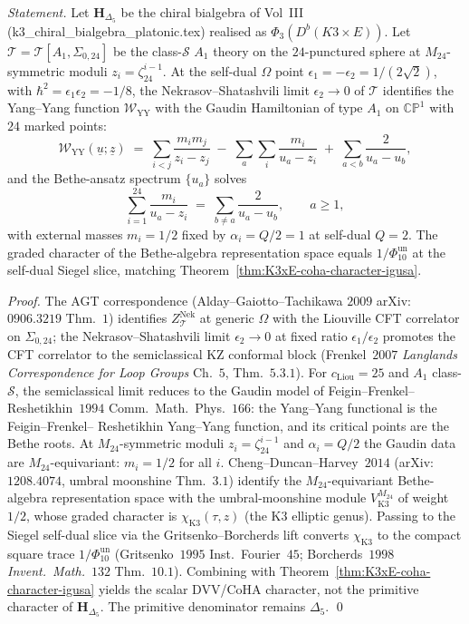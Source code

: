 \begin{proposition}
\label{prop:tcy3-nekrasov-ns-bethe}
\emph{Statement.} Let $\mathbf H_{\Delta_5}$ be the chiral
bialgebra of Vol~III (k3\_chiral\_bialgebra\_platonic.tex) realised
as $\Phi_3(D^b(K3\times E))$. Let $\mathcal T = \mathcal T[A_1,
\Sigma_{0,24}]$ be the class-$\mathcal S$ $A_1$ theory on the
$24$-punctured sphere at $M_{24}$-symmetric moduli $z_i =
\zeta_{24}^{i-1}$. At the self-dual $\Omega$ point
$\epsilon_1 = -\epsilon_2 = 1/(2\sqrt 2)$, with
$\hbar^2 = \epsilon_1\epsilon_2 = -1/8$, the
Nekrasov--Shatashvili limit $\epsilon_2 \to 0$ of $\mathcal T$
identifies the Yang--Yang function $\mathcal W_{\mathrm{YY}}$ with
the Gaudin Hamiltonian of type $A_1$ on $\mathbb{CP}^1$ with $24$
marked points:
\[
 \mathcal W_{\mathrm{YY}}(\underline u;\underline z)
 \;=\; \sum_{i<j}\frac{m_i m_j}{z_i - z_j}
 \;-\;\sum_a\sum_i\frac{m_i}{u_a - z_i}
 \;+\;\sum_{a < b}\frac{2}{u_a - u_b},
\]
and the Bethe-ansatz spectrum $\{u_a\}$ solves
\[
 \sum_{i = 1}^{24}\frac{m_i}{u_a - z_i}
 \;=\;
 \sum_{b\neq a}\frac{2}{u_a - u_b},\qquad a\geq 1,
\]
with external masses $m_i = 1/2$ fixed by $\alpha_i = Q/2 = 1$ at
self-dual $Q = 2$. The graded character of the Bethe-algebra
representation space equals \(1/\Phi_{10}^{\mathrm{un}}\) at the self-dual Siegel
slice, matching
Theorem~\ref{thm:K3xE-coha-character-igusa}.

\emph{Proof.} The AGT correspondence (Alday--Gaiotto--Tachikawa
$2009$ arXiv:$0906.3219$ Thm.~$1$) identifies $Z^{\mathrm{Nek}}_
{\mathcal T}$ at generic $\Omega$ with the Liouville CFT correlator
on $\Sigma_{0,24}$; the Nekrasov--Shatashvili limit
$\epsilon_2 \to 0$ at fixed ratio $\epsilon_1/\epsilon_2$ promotes
the CFT correlator to the semiclassical KZ conformal block
(Frenkel~$2007$ \emph{Langlands Correspondence for Loop Groups}
Ch.~$5$, Thm.~$5.3.1$). For $c_{\mathrm{Liou}} = 25$ and
$A_1$ class-$\mathcal S$, the semiclassical limit reduces to the
Gaudin model of Feigin--Frenkel--Reshetikhin~$1994$ Comm.\ Math.\
Phys.~$166$: the Yang--Yang functional is the Feigin--Frenkel--
Reshetikhin Yang--Yang function, and its critical points are the
Bethe roots. At $M_{24}$-symmetric moduli $z_i = \zeta_{24}^{i-1}$
and $\alpha_i = Q/2$ the Gaudin data are $M_{24}$-equivariant:
$m_i = 1/2$ for all $i$. Cheng--Duncan--Harvey~$2014$ (arXiv:$1208.4074$,
umbral moonshine Thm.~$3.1$) identify the $M_{24}$-equivariant
Bethe-algebra representation space with the umbral-moonshine
module $V_{\mathrm K3}^{M_{24}}$ of weight $1/2$, whose graded
character is $\chi_{\mathrm K3}(\tau, z)$ (the K3 elliptic genus).
Passing to the Siegel self-dual slice via the Gritsenko--Borcherds
lift converts $\chi_{\mathrm K3}$ to the compact square trace
\(1/\Phi_{10}^{\mathrm{un}}\)
(Gritsenko~$1995$ Inst.\ Fourier~$45$; Borcherds~$1998$
\emph{Invent.\ Math.}~$132$ Thm.~$10.1$). Combining with
Theorem~\ref{thm:K3xE-coha-character-igusa} yields the scalar
DVV/CoHA character, not the primitive character of
\(\mathbf H_{\Delta_5}\). The primitive denominator remains
\(\Delta_5\). \qed


\end{proposition}
